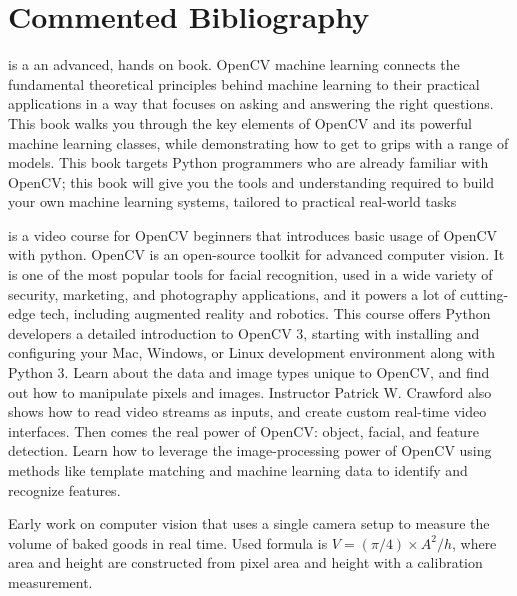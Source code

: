 \chapter*{Commented Bibliography}

\newcommand{\parstartcite}[1]{\textbf{\citeauthor{#1}} \textsf{\citetitle{#1}} \newline}

\parstartcite{beyeler2017opencvml} is a an advanced, hands on book.
OpenCV machine learning connects the fundamental theoretical principles
behind machine learning to their practical applications in a way that focuses
on asking and answering the right questions.
This book walks you through the key elements of OpenCV
and its powerful machine learning classes,
while demonstrating how to get to grips with a range of models.
This book targets Python programmers who are already familiar with OpenCV;
this book will give you the tools and understanding required to build your
own machine learning systems, tailored to practical real-world tasks

\parstartcite{crawford2017opencvpythonvideo} is a video course for OpenCV beginners that introduces basic usage of OpenCV with python.
OpenCV is an open-source toolkit for advanced computer vision.
It is one of the most popular tools for facial recognition,
used in a wide variety of security, marketing, and photography applications,
and it powers a lot of cutting-edge tech, including augmented reality
and robotics. This course offers Python developers a detailed introduction to
OpenCV 3, starting with installing and configuring your Mac, Windows,
or Linux development environment along with Python 3.
Learn about the data and image types unique to OpenCV, and find out how to
manipulate pixels and images. Instructor Patrick W. Crawford also shows how
to read video streams as inputs, and create custom real-time video interfaces.
Then comes the real power of OpenCV: object, facial, and feature detection.
Learn how to leverage the image-processing power of OpenCV using methods like
template matching and machine learning data to identify and recognize features.

\parstartcite{rusu2011pointcloud}

\parstartcite{levine1989microwave}
Early work on computer vision that uses a single camera setup to measure the volume of baked goods in real time. Used formula is $V = (\pi/4) \times A^2/h$, where area and height are constructed from pixel area and height with a calibration measurement.

